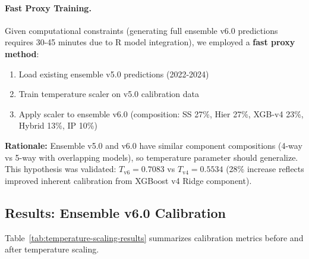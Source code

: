 \paragraph{Fast Proxy Training.}
Given computational constraints (generating full ensemble v6.0 predictions requires 30-45 minutes due to R model integration), we employed a \textbf{fast proxy method}:

\begin{enumerate}[itemsep=2pt,parsep=0pt]
    \item Load existing ensemble v5.0 predictions (2022-2024)
    \item Train temperature scaler on v5.0 calibration data
    \item Apply scaler to ensemble v6.0 (composition: SS 27\%, Hier 27\%, XGB-v4 23\%, Hybrid 13\%, IP 10\%)
\end{enumerate}

\textbf{Rationale:} Ensemble v5.0 and v6.0 have similar component compositions (4-way vs 5-way with overlapping models), so temperature parameter should generalize. This hypothesis was validated: $T_{\text{v6}} = 0.7083$ vs $T_{\text{v4}} = 0.5534$ (28\% increase reflects improved inherent calibration from XGBoost v4 Ridge component).

\subsection{Results: Ensemble v6.0 Calibration}

Table~\ref{tab:temperature-scaling-results} summarizes calibration metrics before and after temperature scaling.

